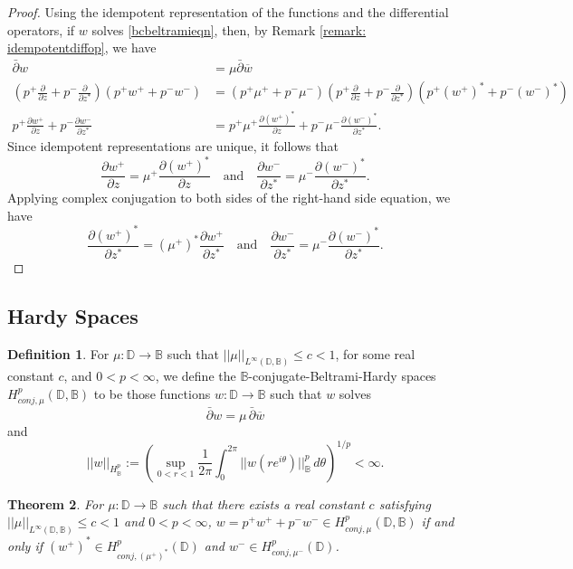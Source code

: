 \documentclass[12pt,reqno]{amsart}
\newtheorem{theorem}{Theorem}[section]
\theoremstyle{definition}
\newtheorem{deff}[theorem]{Definition}
\theoremstyle{remark}
\newcommand{\p}{\partial}
\newcommand{\dbar}{\bar\partial}
\newcommand{\bc}{\mathbb{B}}
\newcommand{\disk}{\mathbb{D}}
\begin{document}
\begin{proof}

    Using the idempotent representation of the functions and the differential operators, if $w$ solves \eqref{bcbeltramieqn}, then, by  Remark \ref{remark: idempotentdiffop}, we have
    \begin{align*}
        \dbar w &= \mu \dbar \overline{w} \\
        \left(p^+\frac{\p}{\p z} + p^- \frac{\p}{\p z^*}\right)(p^+w^+ + p^- w^-) &= (p^+\mu^+ + p^- \mu^-)  \left(p^+\frac{\p}{\p z} + p^- \frac{\p}{\p z^*}\right)(p^+(w^+)^* + p^- (w^-)^*)\\
        p^+ \frac{\p w^+}{\p z} + p^- \frac{\p w^-}{\p z^*} &= p^+ \mu^+ \frac{\p (w^+)^*}{\p z} + p^- \mu^- \frac{\p (w^-)^*}{\p z^*}.
    \end{align*}
    Since idempotent representations are unique, it follows that
    \[
        \frac{\p w^+}{\p z} = \mu^+ \frac{\p (w^+)^*}{\p z}
    \quad \text{and} \quad
        \frac{\p w^-}{\p z^*} = \mu^- \frac{\p (w^-)^*}{\p z^*}.
    \]
    Applying complex conjugation to both sides of the right-hand side equation, we have
    \[
        \frac{\p (w^+)^*}{\p z^*} = (\mu^+)^* \frac{\p w^+}{\p z^*}
    \quad \text{and} \quad
       \frac{\p w^-}{\p z^*} = \mu^- \frac{\p (w^-)^*}{\p z^*}.
    \]
\end{proof}

    \subsection{Hardy Spaces}

\begin{deff}
For $\mu : \disk \to \bc$ such that $||\mu||_{L^\infty(\disk,\bc)} \leq c < 1$, for some real constant $c$, and $0 < p < \infty$, we define the $\bc$-conjugate-Beltrami-Hardy spaces $H^p_{conj,\mu}(\disk,\bc)$ to be those functions $w: \disk\to\bc$ such that $w$ solves
    \[
        \dbar w = \mu \, \dbar \overline{w}
    \]
and 
    \[
        ||w||_{H^p_{\bc}} := \left( \sup_{0< r < 1} \frac{1}{2\pi}\int_0^{2\pi} ||w(re^{i\theta})||_{\bc}^p\,d\theta\right)^{1/p} < \infty.
    \]
\end{deff}

\begin{theorem}\label{thm: bcconjbelhardyrep}
    For $\mu : \disk \to \bc$ such that there exists a real constant $c$ satisfying $||\mu||_{L^\infty(\disk,\bc)} \leq c < 1$ and $0 < p < \infty$, $w = p^+ w^+ + p^- w^- \in H^p_{conj,\mu}(\disk,\bc)$ if and only if $(w^+)^* \in H^p_{conj, (\mu^+)^*}(\disk)$ and $w^- \in H^p_{conj,\mu^-}(\disk)$. 
\end{theorem}
\end{document}
